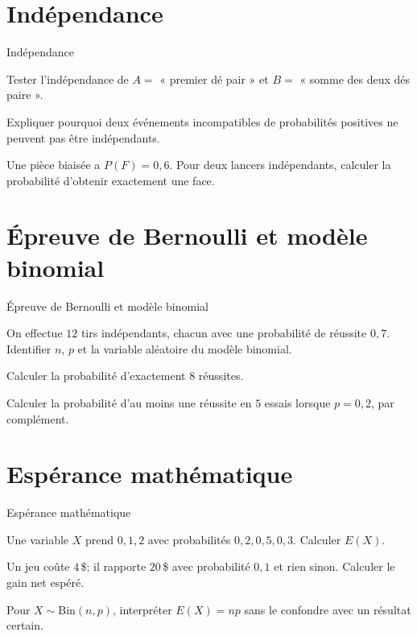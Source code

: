 \section{Indépendance}
\label{workbook:section:08.04}
\begin{exerciseblock}{Indépendance}
\item Tester l'indépendance de $A=$ « premier dé pair » et $B=$ « somme des deux dés paire ».
\item Expliquer pourquoi deux événements incompatibles de probabilités positives ne peuvent pas être indépendants.
\item Une pièce biaisée a $P(F)=0{,}6$. Pour deux lancers indépendants, calculer la probabilité d'obtenir exactement une face.
\end{exerciseblock}
\section{Épreuve de Bernoulli et modèle binomial}
\label{workbook:section:08.05}
\begin{exerciseblock}{Épreuve de Bernoulli et modèle binomial}
\item On effectue $12$ tirs indépendants, chacun avec une probabilité de réussite $0{,}7$. Identifier $n$, $p$ et la variable aléatoire du modèle binomial.
\item Calculer la probabilité d'exactement $8$ réussites.
\item Calculer la probabilité d'au moins une réussite en $5$ essais lorsque $p=0{,}2$, par complément.
\end{exerciseblock}
\section{Espérance mathématique}
\label{workbook:section:08.06}
\begin{exerciseblock}{Espérance mathématique}
\item Une variable $X$ prend $0,1,2$ avec probabilités $0{,}2,0{,}5,0{,}3$. Calculer $E(X)$.
\item Un jeu coûte $4\,$\$; il rapporte $20\,$\$ avec probabilité $0{,}1$ et rien sinon. Calculer le gain net espéré.
\item Pour $X\sim\mathrm{Bin}(n,p)$, interpréter $E(X)=np$ sans le confondre avec un résultat certain.
\end{exerciseblock}
